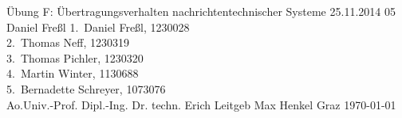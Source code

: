 \TUHeader                          %
{Übung F: Übertragungsverhalten nachrichtentechnischer Systeme}                       %
{25.11.2014}                        %
{05}                            %
{Daniel Freßl}                   %
{
1.~Daniel Freßl, 1230028\\
2.~Thomas Neff, 1230319\\                    %
3.~Thomas Pichler, 1230320 \\                   %
4.~Martin Winter, 1130688\\
5.~Bernadette Schreyer, 1073076\\
}
{Ao.Univ.-Prof. Dipl.-Ing. Dr. techn. Erich Leitgeb}
{Max Henkel}                          %
{Graz}                              %
{\today}                            %




\pagebreak
  
\tableofcontents
  
\pagebreak